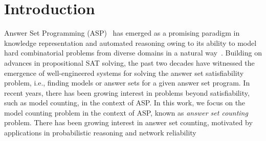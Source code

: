 \section{Introduction}
Answer Set Programming (ASP)~\cite{MT1999} has emerged as a promising paradigm in knowledge representation and automated reasoning owing to its ability to model hard combinatorial problems from diverse domains in a natural way~\cite{brik2015diagnosing}. Building on advances in propositional SAT solving, the past two decades have witnessed the emergence of well-engineered systems for solving the answer set satisfiability problem, i.e., finding models or answer sets for a given answer set program. In recent years, there has been growing interest in problems beyond satisfiability, such as model counting, in the context of ASP. In this work, we focus on the model counting problem in the context of ASP, known as {\em answer set counting} problem. There has been growing interest in answer set counting, motivated by applications in probabilistic reasoning and network reliability~\cite{KM2023, ACMS2015,HJK2022}
